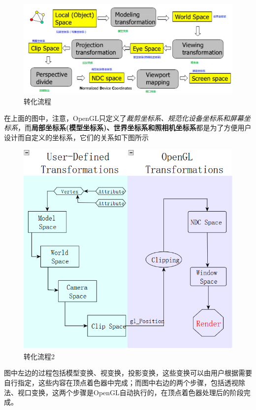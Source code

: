 \documentclass[UTF8,a4paper,8pt]{ctexbook}
\begin{document}
		\begin{figure}[htbp]
			\centering
			\includegraphics[scale = 0.57]{transferAll.png}
			\caption{转化流程}
		\end{figure}
		
		在上面的图中，注意，OpenGL只定义了\textit{裁剪坐标系、规范化设备坐标系和屏幕坐标系}，而\textbf{局部坐标系(模型坐标系)、世界坐标系和照相机坐标系}都是为了方便用户设计而自定义的坐标系，它们的关系如下图所示
		
		\begin{figure}[htbp]
			\centering
			\includegraphics[scale = 0.9]{transferAll2.png}
			\caption{转化流程2}
		\end{figure}
		
		图中左边的过程包括模型变换、视变换，投影变换，这些变换可以由用户根据需要自行指定，这些内容在顶点着色器中完成；而图中右边的两个步骤，包括透视除法、视口变换，这两个步骤是OpenGL自动执行的，在顶点着色器处理后的阶段完成。
		
\end{document}
